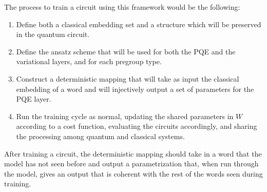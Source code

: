 The process to train a circuit using this framework would be the following:
\begin{enumerate}
    \item Define both a classical embedding set and a structure which will be preserved in the quantum circuit.
    \item Define the ansatz scheme that will be used for both the PQE and the variational layers, and for each pregroup type.
    \item Construct a deterministic mapping that will take as input the classical embedding of a word and will injectively output a set of parameters for the PQE layer.
    \item Run the training cycle as normal, updating the shared parameters in $W$ according to a cost function, evaluating the circuits accordingly, and sharing the processing among quantum and classical systems.
\end{enumerate}
After training a circuit, the deterministic mapping should take in a word that the model has not seen before and output a parametrization that, when run through the model, gives an output that is coherent with the rest of the words seen during training.